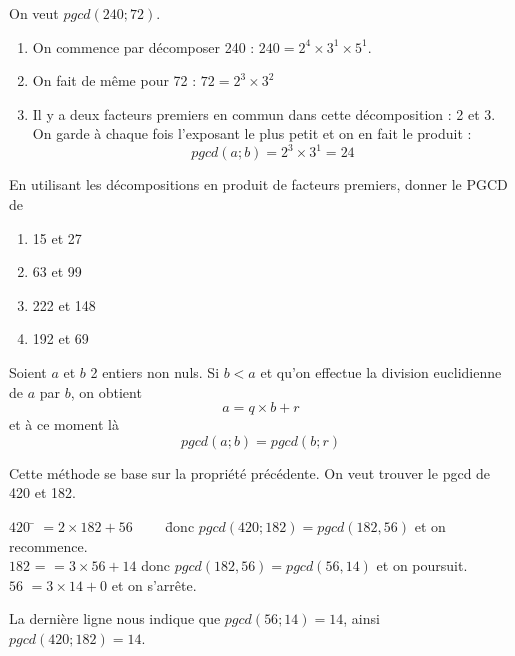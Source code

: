 \documentclass[a4paper,12pt,french]{book}
\begin{document}
\begin{exemple}[]
	On veut $pgcd(240;72)$.
	\begin{enumerate}[\textbullet]
		\item 	On commence par décomposer 240 : $240=2^4\times 3^1\times 5^1$.
		\item 	On fait de même pour 72 : $72 = 2^3\times3^2$
		\item 	Il y a deux facteurs premiers en commun dans cette décomposition : 2 et 3. On garde à chaque fois l'exposant le plus petit et on en fait le produit : $$pgcd(a;b)=2^3\times 3^1=24$$	\end{enumerate}
\end{exemple}


\begin{exercice}
	
	En utilisant les décompositions en produit de facteurs premiers, donner le \textsc{PGCD} de 
	
	\begin{multicols}{4}
		\begin{enumerate}[\bfseries a.]
			\item 15 et 27
			\item 63 et 99
			\item 222 et 148
			\item 192 et 69
		\end{enumerate}
	\end{multicols}
	
\end{exercice}


\begin{propriete}[]
	Soient $a$ et $b$ 2 entiers non nuls. Si $b<a$ et qu'on effectue la division euclidienne de $a$ par $b$, on obtient $$a = q\times b +r$$ et à ce moment là
	$$pgcd(a;b)=pgcd(b;r)$$
\end{propriete}
\begin{methode}
	Cette méthode se base sur la propriété précédente. On veut trouver le pgcd de 420 et 182.
	\begin{tabbing}
		$420$ 	\= $=2\times 182+56\qquad$ \= donc $pgcd(420;182)=pgcd(182,56)$ et on recommence.\\
		$182$	\>= $=3\times 56+14$ \>  donc $pgcd(182,56)=pgcd(56,14)$ et on poursuit.\\
		$56$	\> $=3\times 14+\boxed{0}$ \> et on s'arrête.
	\end{tabbing}
	La dernière ligne nous indique que $pgcd(56;14)=14$, ainsi $pgcd(420;182)=14$.
\end{methode}
\end{document}

